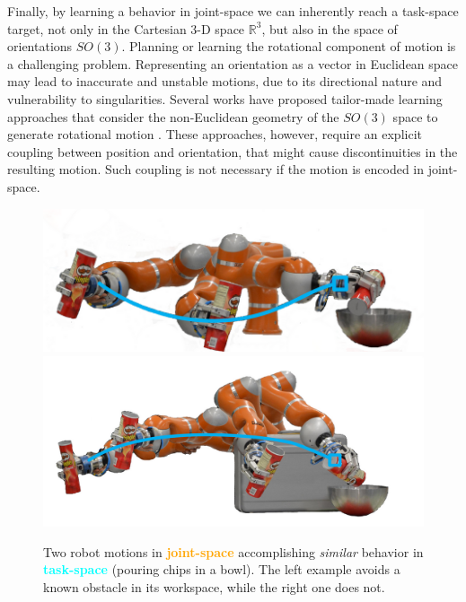 \documentclass[letterpaper, 10 pt, journal, twoside, fleqn]{IEEEtran}
\begin{document}
Finally, by learning a behavior in joint-space we can inherently reach a task-space target, not only in the Cartesian 3-D space $\mathbb{R}^3$, but also in the space of orientations $SO(3)$. Planning or learning the rotational component of motion is a challenging problem. Representing an orientation as a vector in Euclidean space may lead to inaccurate and unstable motions, due to its directional nature and vulnerability to singularities. Several works have proposed tailor-made learning approaches that consider the non-Euclidean geometry of the $SO(3)$ space to generate rotational motion \cite{KIM201728} \cite{6907291} \cite{7829369}. These approaches, however, require an explicit coupling between position and orientation, that might cause discontinuities in the resulting motion. Such coupling is not necessary if the motion is encoded in joint-space. 
\begin{figure}[t]
\centering
\includegraphics[scale=.155,trim={0 0 0 0cm},clip]{./figures/Without_Obstcle_white_new.png}\includegraphics[scale=.125,trim={0 0 0 0cm},clip]{./figures/With_Obstcle.png}
\caption{Two robot motions in \textcolor{orange}{\textbf{joint-space}} accomplishing \textit{similar} behavior in \textcolor{cyan}{\textbf{task-space}} (pouring chips in a bowl). The left example avoids a known obstacle in its workspace, while the right one does not.}
\label{fig:robot_example}
\vspace{-20pt}
\end{figure}
\end{document}
